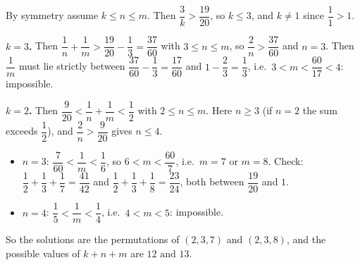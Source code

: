 By symmetry assume $k\le n\le m$. Then $\dfrac{3}{k}>\dfrac{19}{20}$, so $k\le3$, and $k\ne1$ since $\dfrac{1}{1}>1$.

\textbf{$k=3$.} Then $\dfrac{1}{n}+\dfrac{1}{m}>\dfrac{19}{20}-\dfrac{1}{3}=\dfrac{37}{60}$ with $3\le n\le m$, so $\dfrac{2}{n}>\dfrac{37}{60}$ and $n=3$. Then $\dfrac{1}{m}$ must lie strictly between $\dfrac{37}{60}-\dfrac{1}{3}=\dfrac{17}{60}$ and $1-\dfrac{2}{3}=\dfrac{1}{3}$, i.e.\ $3<m<\dfrac{60}{17}<4$: impossible.

\textbf{$k=2$.} Then $\dfrac{9}{20}<\dfrac{1}{n}+\dfrac{1}{m}<\dfrac{1}{2}$ with $2\le n\le m$. Here $n\ge3$ (if $n=2$ the sum exceeds $\dfrac{1}{2}$), and $\dfrac{2}{n}>\dfrac{9}{20}$ gives $n\le4$.
\begin{itemize}
\item $n=3$: $\dfrac{7}{60}<\dfrac{1}{m}<\dfrac{1}{6}$, so $6<m<\dfrac{60}{7}$, i.e.\ $m=7$ or $m=8$. Check: $\dfrac{1}{2}+\dfrac{1}{3}+\dfrac{1}{7}=\dfrac{41}{42}$ and $\dfrac{1}{2}+\dfrac{1}{3}+\dfrac{1}{8}=\dfrac{23}{24}$, both between $\dfrac{19}{20}$ and $1$.
\item $n=4$: $\dfrac{1}{5}<\dfrac{1}{m}<\dfrac{1}{4}$, i.e.\ $4<m<5$: impossible.
\end{itemize}
So the solutions are the permutations of $(2,3,7)$ and $(2,3,8)$, and the possible values of $k+n+m$ are $\boxed{12\text{ and }13}$.
